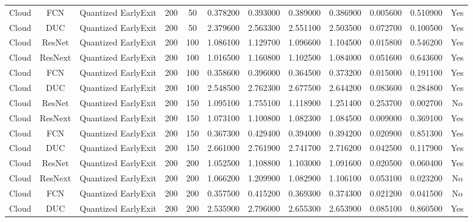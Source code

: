 \begin{tabular}{|c||c||c||c||c||c||c||c||c||c||c||c|}
Cloud & FCN & Quantized EarlyExit & 200 & 50 & 0.378200 & 0.393000 & 0.389000 & 0.386900 & 0.005600 & 0.510900 & Yes \\
Cloud & DUC & Quantized EarlyExit & 200 & 50 & 2.379600 & 2.563300 & 2.551100 & 2.503500 & 0.072700 & 0.100500 & Yes \\
Cloud & ResNet & Quantized EarlyExit & 200 & 100 & 1.086100 & 1.129700 & 1.096600 & 1.104500 & 0.015800 & 0.546200 & Yes \\
Cloud & ResNext & Quantized EarlyExit & 200 & 100 & 1.016500 & 1.160800 & 1.102500 & 1.084000 & 0.051600 & 0.643600 & Yes \\
Cloud & FCN & Quantized EarlyExit & 200 & 100 & 0.358600 & 0.396000 & 0.364500 & 0.373200 & 0.015000 & 0.191100 & Yes \\
Cloud & DUC & Quantized EarlyExit & 200 & 100 & 2.548500 & 2.762300 & 2.677500 & 2.644200 & 0.083600 & 0.284800 & Yes \\
Cloud & ResNet & Quantized EarlyExit & 200 & 150 & 1.095100 & 1.755100 & 1.118900 & 1.251400 & 0.253700 & 0.002700 & No \\
Cloud & ResNext & Quantized EarlyExit & 200 & 150 & 1.073100 & 1.100800 & 1.082300 & 1.084500 & 0.009000 & 0.369100 & Yes \\
Cloud & FCN & Quantized EarlyExit & 200 & 150 & 0.367300 & 0.429400 & 0.394000 & 0.394200 & 0.020900 & 0.851300 & Yes \\
Cloud & DUC & Quantized EarlyExit & 200 & 150 & 2.661000 & 2.761900 & 2.741700 & 2.716200 & 0.042500 & 0.117900 & Yes \\
Cloud & ResNet & Quantized EarlyExit & 200 & 200 & 1.052500 & 1.108800 & 1.103000 & 1.091600 & 0.020500 & 0.060400 & Yes \\
Cloud & ResNext & Quantized EarlyExit & 200 & 200 & 1.066200 & 1.209900 & 1.082900 & 1.106100 & 0.053100 & 0.023200 & No \\
Cloud & FCN & Quantized EarlyExit & 200 & 200 & 0.357500 & 0.415200 & 0.369300 & 0.374300 & 0.021200 & 0.041500 & No \\
Cloud & DUC & Quantized EarlyExit & 200 & 200 & 2.535900 & 2.796000 & 2.655300 & 2.653900 & 0.085100 & 0.860500 & Yes \\
\bottomrule
\end{tabular}
